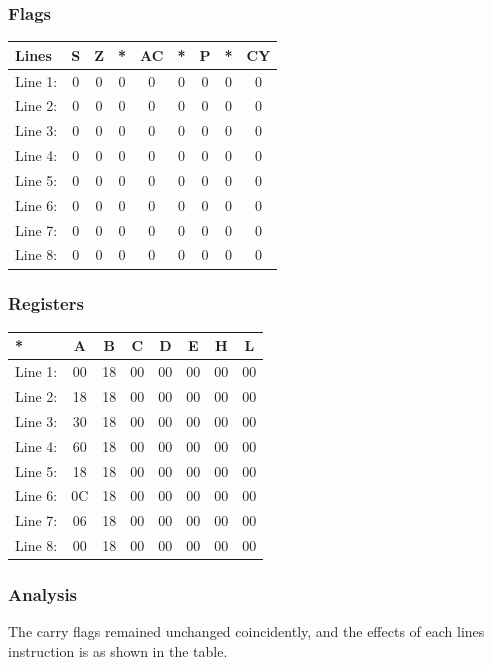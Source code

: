 \documentclass[]{report}
\begin{document}
\subsubsection{Flags}
\begin{tabular}{lcccccccc}
\hline
    Lines & S & Z & *  & AC & *  & P & *  & CY  \\
    \hline
    Line 1: & 0&0&0&0&0&0&0&0\\
    Line 2: & 0&0&0&0&0&0&0&0\\
    Line 3: & 0&0&0&0&0&0&0&0\\
    Line 4: & 0&0&0&0&0&0&0&0\\
    Line 5: & 0&0&0&0&0&0&0&0\\
    Line 6: & 0&0&0&0&0&0&0&0\\
    Line 7: & 0&0&0&0&0&0&0&0\\
    Line 8: & 0&0&0&0&0&0&0&0\\
    \hline
\end{tabular}

\subsubsection{Registers}
\begin{tabular}{lccccccc}
\hline
    *       & A & B & C  & D & E  & H & L  \\
    \hline
    Line 1: & 00 & 18 & 00 & 00 & 00 & 00 & 00   \\
    Line 2: & 18 & 18 & 00 & 00 & 00 & 00 & 00   \\
    Line 3: & 30 & 18 & 00 & 00 & 00 & 00 & 00   \\
    Line 4: & 60 & 18 & 00 & 00 & 00 & 00 & 00   \\
    Line 5: & 18 & 18 & 00 & 00 & 00 & 00 & 00   \\
    Line 6: & 0C & 18 & 00 & 00 & 00 & 00 & 00   \\
    Line 7: & 06 & 18 & 00 & 00 & 00 & 00 & 00   \\
    Line 8: & 00 & 18 & 00 & 00 & 00 & 00 & 00   \\
    \hline
\end{tabular}

\subsubsection {Analysis}
The carry flags remained unchanged coincidently, and the effects of each lines instruction is as shown in the table.


\pagebreak
\end{document}
